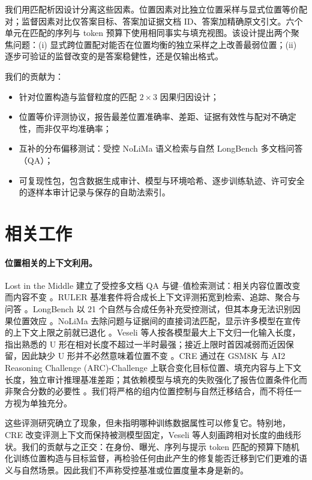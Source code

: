 \documentclass[11pt]{article}
\begin{document}
我们用匹配析因设计分离这些因素。位置因素对比独立位置采样与显式位置等价配对；监督因素对比仅答案目标、答案加证据文档 ID、答案加精确原文引文。六个单元在匹配的序列与 token 预算下使用相同事实与填充视图。该设计提出两个聚焦问题：(i) 显式跨位置配对能否在位置均衡的独立采样之上改善最弱位置；(ii) 逐步可验证的监督改变的是答案稳健性，还是仅输出格式。

我们的贡献为：
\begin{itemize}
    \item 针对位置构造与监督粒度的匹配 $2\times3$ 因果归因设计；
    \item 位置等价评测协议，报告最差位置准确率、差距、证据有效性与配对不确定性，而非仅平均准确率；
    \item 互补的分布偏移测试：受控 NoLiMa 语义检索与自然 LongBench 多文档问答（QA）；
    \item 可复现性包，包含数据生成审计、模型与环境哈希、逐步训练轨迹、许可安全的逐样本审计记录与保存的自助法索引。
\end{itemize}

\section{相关工作}

\paragraph{位置相关的上下文利用。}
Lost in the Middle 建立了受控多文档 QA 与键--值检索测试：相关内容位置改变而内容不变 \citep{liu2024lost}。RULER 基准套件将合成长上下文评测拓宽到检索、追踪、聚合与问答 \citep{hsieh2024ruler}。LongBench 以 21 个自然与合成任务补充受控测试，但其本身无法识别因果位置效应 \citep{bai2024longbench}。NoLiMa 去除问题与证据间的直接词法匹配，显示许多模型在宣传的上下文上限之前就已退化 \citep{modarressi2025nolima}。Veseli 等人按各模型最大上下文归一化输入长度，指出熟悉的 U 形在相对长度不超过一半时最强；接近上限时首因减弱而近因保留，因此缺少 U 形并不必然意味着位置不变 \citep{veseli2025shift}。CRE 通过在 GSM8K 与 AI2 Reasoning Challenge (ARC)-Challenge 上联合变化目标位置、填充内容与上下文长度，独立审计推理基准差距；其依赖模型与填充的失败强化了报告位置条件化而非聚合分数的必要性 \citep{zhang2026positional}。我们将严格的组内位置控制与自然迁移结合，而不将任一方视为单独充分。

这些评测研究确立了现象，但未指明哪种训练数据属性可以修复它。特别地，CRE 改变评测上下文而保持被测模型固定，Veseli 等人刻画跨相对长度的曲线形状。我们的贡献与之正交：在身份、曝光、序列与提示 token 匹配的预算下随机化训练位置构造与目标监督，再检验任何由此产生的修复能否迁移到它们更难的语义与自然场景。因此我们不声称受控基准或位置度量本身是新的。
\end{document}
